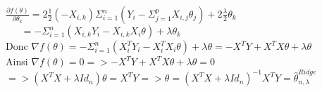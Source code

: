 \documentclass[11pt,a4paper,fleqn]{article}
\begin{document}
$\frac{\partial f(\theta)}{\partial \theta_k}=2\frac{1}{2} (-X_{i,k}) \Sigma_{i=1}^n (Y_i-\Sigma_{j=1}^pX_{i,j}\theta_j)+2\frac{\lambda}{2} \theta_k$ \\

$~~~~~~~=-\Sigma_{i=1}^n(X_{i,k}Y_i-X_{i,k}X_i\theta)+\lambda \theta_k$ \\

Donc $\nabla f(\theta)=-\Sigma_{i=1}^n(X_i^TY_i-X_i^TX_i\theta)+\lambda \theta=-X^TY+X^TX\theta + \lambda \theta$ \\

Ainsi $\nabla f(\theta)=0 => -X^TY+X^TX\theta + \lambda \theta=0$ \\
$=> (X^TX + \lambda Id_n)\theta = X^TY => \theta = (X^TX + \lambda Id_n)^{-1} X^TY = \hat{\theta}_{n,\lambda}^{Ridge} $ \\
\end{document}
